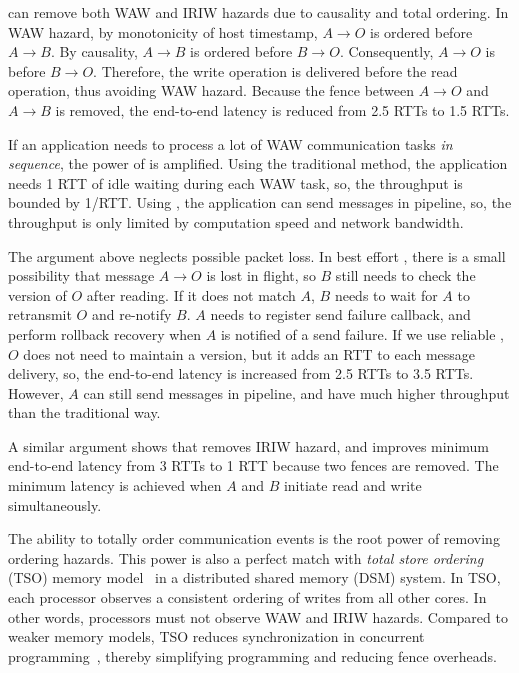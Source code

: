 \sys{} can remove both WAW and IRIW hazards due to causality and total ordering.
In WAW hazard, by monotonicity of host timestamp, $A \rightarrow O$ is ordered before $A \rightarrow B$. By causality, $A \rightarrow B$ is ordered before $B \rightarrow O$.
Consequently, $A \rightarrow O$ is before $B \rightarrow O$.
Therefore, the write operation is delivered before the read operation, thus avoiding WAW hazard.
Because the fence between $A \rightarrow O$ and $A \rightarrow B$ is removed, the end-to-end latency is reduced from 2.5 RTTs to 1.5 RTTs.

If an application needs to process a lot of WAW communication tasks \emph{in sequence}, the power of \sys{} is amplified. Using the traditional method, the application needs 1 RTT of idle waiting during each WAW task, so, the throughput is bounded by 1/RTT. Using \sys{}, the application can send messages in pipeline, so, the throughput is only limited by computation speed and network bandwidth.

The argument above neglects possible packet loss.
In best effort \sys{}, there is a small possibility that message $A \rightarrow O$ is lost in flight, so $B$ still needs to check the version of $O$ after reading. If it does not match $A$, $B$ needs to wait for $A$ to retransmit $O$ and re-notify $B$.
$A$ needs to register send failure callback, and perform rollback recovery when $A$ is notified of a send failure.
If we use reliable \sys{}, $O$ does not need to maintain a version, but it adds an RTT to each message delivery, so, the end-to-end latency is increased from 2.5 RTTs to 3.5 RTTs. However, $A$ can still send messages in pipeline, and have much higher throughput than the traditional way.

A similar argument shows that \sys{} removes IRIW hazard, and improves minimum end-to-end latency from 3 RTTs to 1 RTT because two fences are removed. The minimum latency is achieved when $A$ and $B$ initiate read and write simultaneously.

The ability to totally order communication events is the root power of removing ordering hazards.
This power is also a perfect match with \textit{total store ordering} (TSO) memory model~\cite{sewell2010x86} in a distributed shared memory (DSM) system. In TSO, each processor observes a consistent ordering of writes from all other cores. In other words, processors must not observe WAW and IRIW hazards.
Compared to weaker memory models, TSO reduces synchronization in concurrent programming~\cite{morrison2013fast,tassarotti2015verifying}, thereby simplifying programming and reducing fence overheads.


